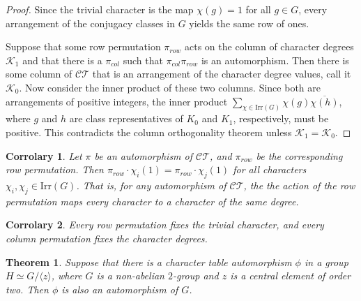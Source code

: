 \documentclass[12pt,letterpaper]{article}
\newtheorem{thm}{Theorem}
\newtheorem{cor}{Corrolary}
\begin{document}
\begin{proof}
  Since the trivial character is the map $\chi(g)=1$ for all $g\in G$,
  every arrangement of the conjugacy classes in $G$ yields the same
  row of ones. 

  Suppose that some row permutation $\pi_{row}$ acts on the column of
  character degrees $\mathcal{K}_1$ and that there is a $\pi_{col}$
  such that $\pi_{col}\pi_{row}$ is an automorphism. Then there is
  some column of $\mathcal{CT}$ that is an arrangement of the
  character degree values, call it $\mathcal{K}_0$. Now consider the
  inner product of these two columns. Since both are arrangements of
  positive integers, the inner product
  $\sum_{\chi\in \mathrm{Irr}(G)}\chi(g)\overline{\chi(h)}$, where $g$
  and $h$ are class representatives of $K_0$ and $K_1$, respectively,
  must be positive. This contradicts the column orthogonality
  theorem unless $\mathcal{K}_1=\mathcal{K}_0$.
\end{proof}

\begin{cor}
  Let $\pi$ be an automorphism of $\mathcal{CT}$, and $\pi_{row}$ be
  the corresponding row permutation.  Then
  $\pi_{row}\cdot\chi_i(1)=\pi_{row}\cdot\chi_j(1)$ for all characters
  $\chi_i,\chi_j\in\mathrm{Irr}(G)$. That is, for any automorphism of
  $\mathcal{CT}$, the the action of the row permutation maps every
  character to a character of the same degree.
\end{cor}

\begin{cor}
  Every row permutation fixes the trivial character, and every column
  permutation fixes the character degrees.
\end{cor}

\begin{thm}
   Suppose that there is a character table automorphism $\phi$ in a group
   $H\simeq G/\langle z\rangle$, where $G$ is a non-abelian $2$-group
   and $z$ is a central element of order two. Then $\phi$ is also an
   automorphism of $G$. 
\end{thm}
\end{document}
